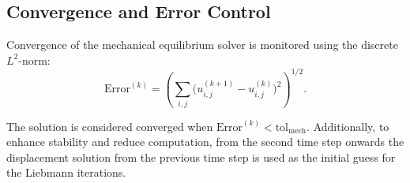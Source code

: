 \subsection{Convergence and Error Control}

Convergence of the mechanical equilibrium solver is monitored using the discrete $L^2$-norm:
\begin{equation}\label{eq:convergence_norm}
\mathrm{Error}^{(k)} = \left(\sum_{i,j} \big( u^{(k+1)}_{i,j} - u^{(k)}_{i,j} \big)^{2}\right)^{1/2}.
\end{equation}

The solution is considered converged when $\mathrm{Error}^{(k)} < \text{tol}_{\mathrm{mech}}$. Additionally, to enhance stability and reduce computation, from the second time step onwards the displacement solution from the previous time step is used as the initial guess for the Liebmann iterations.



